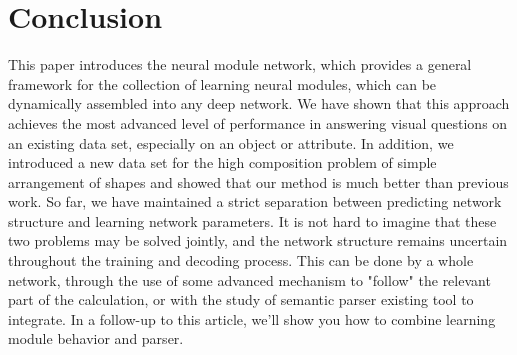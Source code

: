 \documentclass[a4paper,18pt]{article}
\begin{document}
\section{Conclusion}
This paper introduces the neural module network, which provides a general framework for the collection of learning neural modules, which can be dynamically assembled into any deep network. We have shown that this approach achieves the most advanced level of performance in answering visual questions on an existing data set, especially on an object or attribute. In addition, we introduced a new data set for the high composition problem of simple arrangement of shapes and showed that our method is much better than previous work. So far, we have maintained a strict separation between predicting network structure and learning network parameters. It is not hard to imagine that these two problems may be solved jointly, and the network structure remains uncertain throughout the training and decoding process. This can be done by a whole network, through the use of some advanced mechanism to "follow" the relevant part of the calculation, or with the study of semantic parser\cite{Krishnamurthyi_2013_Jointly} existing tool to integrate. In a follow-up to this article, we'll show you how to combine learning module behavior and parser.

	
\small{
}
%  
%
 
   
\end{document}
